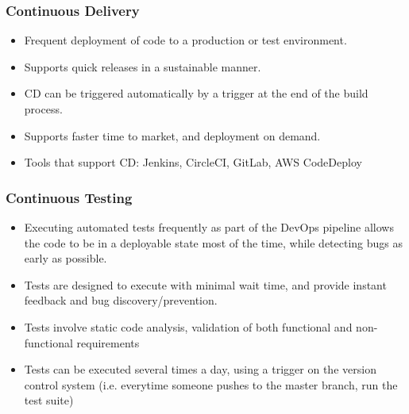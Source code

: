 \documentclass{article}
\begin{document}
\subsubsection{Continuous Delivery}
\begin{itemize}
    \item Frequent deployment of code to a production or test environment. 
    
    \item Supports quick releases in a sustainable manner. 
    
    \item CD can be triggered automatically by a trigger at the end of the build process.
    
    \item Supports faster time to market, and deployment on demand. 
    
    \item Tools that support CD: Jenkins, CircleCI, GitLab, AWS CodeDeploy
\end{itemize}

\subsubsection{Continuous Testing}
\begin{itemize}
    \item Executing automated tests frequently as part of the DevOps pipeline allows the code to be in a deployable state most of the time, while detecting bugs as early as possible.
    
    \item Tests are designed to execute with minimal wait time, and provide instant feedback and bug discovery/prevention. 
    
    \item Tests involve static code analysis, validation of both functional and non-functional requirements
    
    \item Tests can be executed several times a day, using a trigger on the version control system (i.e. everytime someone pushes to the master branch, run the test suite)
\end{itemize}
\end{document}
